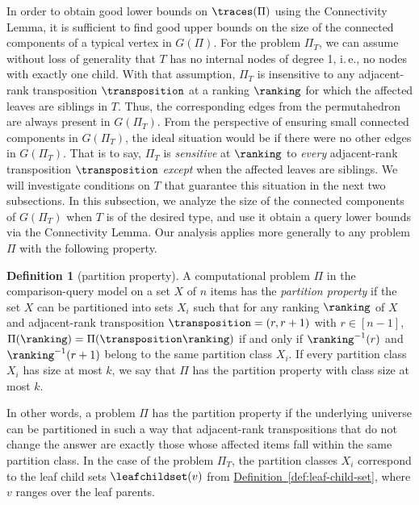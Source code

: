 \documentclass[11pt]{article}
\numberwithin{equation}{section}
\theoremstyle{definition}
\newtheorem{definition}[theorem]{Definition}
\theoremstyle{plain}
\newcommand{\ie}{i.\,e.}
\newcommand{\expref}[2]{\hyperref[#2]{#1~\ref{#2}}}
\begin{document}
In order to obtain good lower bounds on $\traces(\Pi)$ using the Connectivity Lemma, it is sufficient to find good upper bounds on the size of the connected components of a typical vertex in $G(\Pi)$. For the problem $\Pi_T$, we can assume without loss of generality that $T$ has no internal nodes of degree 1, \ie, no nodes with exactly one child. With that assumption, $\Pi_T$ is insensitive to any adjacent-rank transposition $\transposition$ at a ranking $\ranking$ for which the affected leaves are siblings in $T$. Thus, the corresponding edges from the permutahedron are always present in $G(\Pi_T)$. From the perspective of ensuring small connected components in $G(\Pi_T)$, the ideal situation would be if there were no other edges in $G(\Pi_T)$. That is to say, $\Pi_T$ is \emph{sensitive} at $\ranking$ to \emph{every} adjacent-rank transposition $\transposition$ \emph{except} when the affected leaves are siblings. We will investigate conditions on $T$ that guarantee this situation in the next two subsections. In this subsection, we analyze the size of the connected components of $G(\Pi_T)$ when $T$ is of the desired type, and use it obtain a query lower bounds via the Connectivity Lemma. Our analysis applies more generally to any problem $\Pi$ with the following property.
\begin{definition}[partition property]\label{def:partition-property}
A computational problem $\Pi$ in the comparison-query model on a set $X$ of $n$ items has the \emph{partition property} if the set $X$ can be partitioned into sets $X_i$ such that for any ranking $\ranking$ of $X$ and adjacent-rank transposition $\transposition = (r, r+1)$ with $r \in [n-1]$, $\Pi(\ranking) = \Pi(\transposition \ranking)$ if and only if $\ranking^{-1}(r)$ and $\ranking^{-1}(r+1)$ belong to the same partition class $X_i$. If every partition class $X_i$ has size at most $k$, we say that $\Pi$ has the partition property with class size at most $k$.
\end{definition}
In other words, a problem $\Pi$ has the partition property if the underlying universe can be partitioned in such a way that 
adjacent-rank transpositions that do not change the answer are exactly those whose affected items fall within the same partition class. In the case of the problem $\Pi_T$, the partition classes $X_i$ correspond to the leaf child sets $\leafchildset(v)$ from \expref{Definition}{def:leaf-child-set}, where $v$ ranges over the leaf parents.
\end{document}
